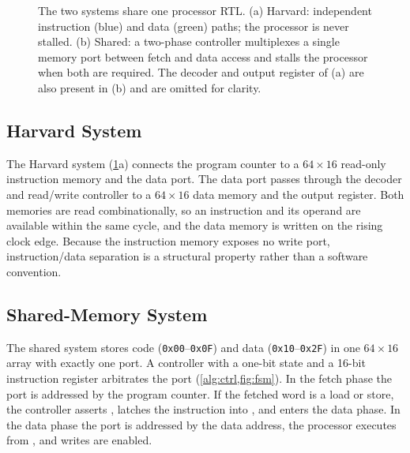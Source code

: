 \documentclass[conference]{IEEEtran}
\newcommand{\sig}[1]{\texttt{\detokenize{#1}}}
\begin{document}
\begin{figure}[t]
\caption{The two systems share one processor RTL. (a) Harvard: independent instruction (blue) and
data (green) paths; the processor is never stalled. (b) Shared: a two-phase controller multiplexes a
single memory port between fetch and data access and stalls the processor when both are required.
The decoder and output register of (a) are also present in (b) and are omitted for clarity.}
\label{fig:arch}
\end{figure}

\subsection{Harvard System}
The Harvard system (\cref{fig:arch}a) connects the program counter to a $64\times16$ read-only
instruction memory and the data port. The data port passes through the decoder and read/write
controller to a $64\times16$ data memory and the output register. Both memories are read
combinationally, so an instruction and its operand are available within the same cycle, and the data
memory is written on the rising clock edge. Because the instruction memory exposes no write port,
instruction/data separation is a structural property rather than a software convention.

\subsection{Shared-Memory System}
\label{sec:controller}
The shared system stores code (\texttt{0x00}--\texttt{0x0F}) and data (\texttt{0x10}--\texttt{0x2F})
in one $64\times16$ array with exactly one port. A controller with a one-bit state \sig{phase} and a
16-bit instruction register \sig{IR} arbitrates the port (\cref{alg:ctrl,fig:fsm}). In the fetch phase
the port is addressed by the program counter. If the fetched word is a load or store, the controller
asserts \sig{stall}, latches the instruction into \sig{IR}, and enters the data phase. In the data
phase the port is addressed by the data address, the processor executes from \sig{IR}, and writes
are enabled.
\end{document}
